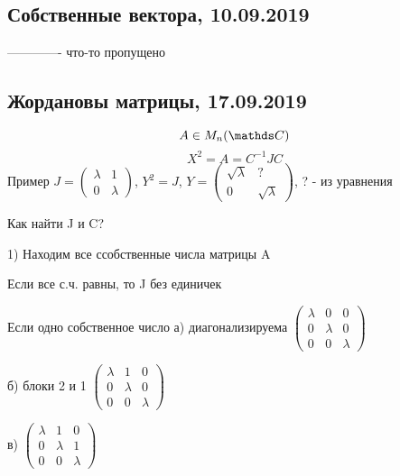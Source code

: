 \documentclass[12pt, fleqn]{article}
\begin{document}
\subsection{Собственные вектора, 10.09.2019}
------------- что-то пропущено\\
\subsection{Жордановы матрицы, 17.09.2019}

\begin{Example}
    \[A \in M_n(\CC)\]
    \[X^2=A=C^{-1}J C\]
    Пример $J=\begin{pmatrix}
      \lambda & 1\\
      0 & \lambda
    \end{pmatrix}$, $Y^2=J$, $Y=\begin{pmatrix}
      \sqrt{\lambda} & ?\\
      0 & \sqrt{\lambda}
    \end{pmatrix}$, ? - из уравнения
\end{Example}

Как найти J и C?

1) Находим все ссобственные числа матрицы A

Если все с.ч. равны, то J без единичек

Если одно собственное число
а) диагонализируема
$\begin{pmatrix}
\lambda & 0 & 0\\
0 & \lambda & 0\\
0 & 0 & \lambda
\end{pmatrix}$

б) блоки 2 и 1
$\begin{pmatrix}
\lambda & 1 & 0\\
0 & \lambda & 0\\
0 & 0 & \lambda
\end{pmatrix}$

в) $\begin{pmatrix}
\lambda & 1 & 0\\
0 & \lambda & 1\\
0 & 0 & \lambda
\end{pmatrix}$
\end{document}
